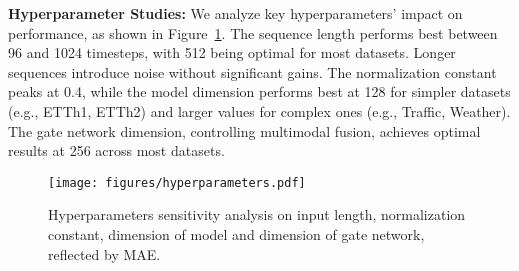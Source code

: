 

\noindent\textbf{Hyperparameter Studies:} We analyze key hyperparameters' impact on performance, as shown in Figure~\ref{fig:hyperparameters}. The sequence length performs best between 96 and 1024 timesteps, with 512 being optimal for most datasets. Longer sequences introduce noise without significant gains. The normalization constant peaks at 0.4, while the model dimension performs best at 128 for simpler datasets (e.g., ETTh1, ETTh2) and larger values for complex ones (e.g., Traffic, Weather). The gate network dimension, controlling multimodal fusion, achieves optimal results at 256 across most datasets.

\vspace{-0.5em}
\begin{figure}[h!]
    \centering
    \texttt{[image: figures/hyperparameters.pdf]}
    \caption{Hyperparameters sensitivity analysis on input length, normalization constant, dimension of model and dimension of gate network, reflected by MAE.}
    \label{fig:hyperparameters}
\end{figure}
\vspace{-0.5em}
